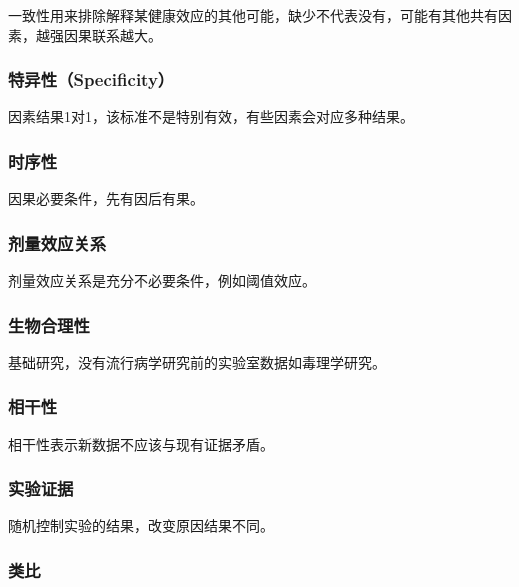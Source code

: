 \documentclass[]{book}
\begin{document}
一致性用来排除解释某健康效应的其他可能，缺少不代表没有，可能有其他共有因素，越强因果联系越大。

\hypertarget{ux7279ux5f02ux6027specificity}{%
\subsubsection{特异性（Specificity）}\label{ux7279ux5f02ux6027specificity}}

因素结果1对1，该标准不是特别有效，有些因素会对应多种结果。

\hypertarget{ux65f6ux5e8fux6027}{%
\subsubsection{时序性}\label{ux65f6ux5e8fux6027}}

因果必要条件，先有因后有果。

\hypertarget{ux5242ux91cfux6548ux5e94ux5173ux7cfb}{%
\subsubsection{剂量效应关系}\label{ux5242ux91cfux6548ux5e94ux5173ux7cfb}}

剂量效应关系是充分不必要条件，例如阈值效应。

\hypertarget{ux751fux7269ux5408ux7406ux6027}{%
\subsubsection{生物合理性}\label{ux751fux7269ux5408ux7406ux6027}}

基础研究，没有流行病学研究前的实验室数据如毒理学研究。

\hypertarget{ux76f8ux5e72ux6027}{%
\subsubsection{相干性}\label{ux76f8ux5e72ux6027}}

相干性表示新数据不应该与现有证据矛盾。

\hypertarget{ux5b9eux9a8cux8bc1ux636e}{%
\subsubsection{实验证据}\label{ux5b9eux9a8cux8bc1ux636e}}

随机控制实验的结果，改变原因结果不同。

\hypertarget{ux7c7bux6bd4}{%
\subsubsection{类比}\label{ux7c7bux6bd4}}
\end{document}
